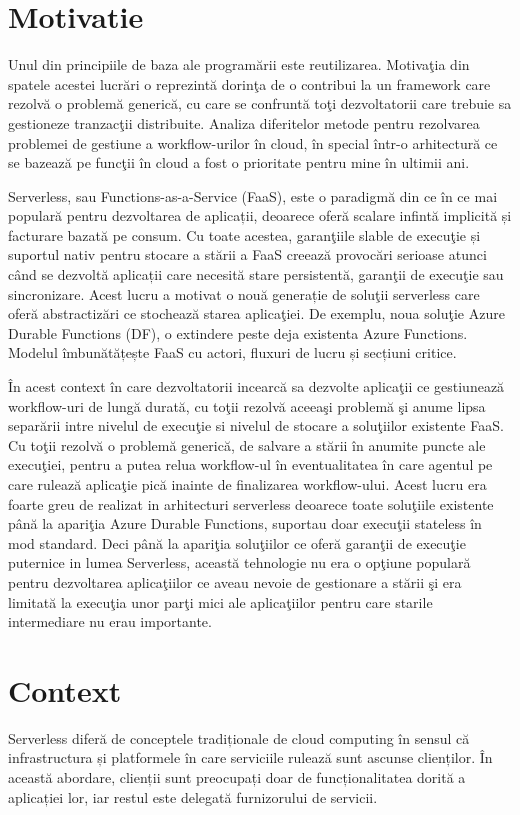 \documentclass[a4paper,12pt]{report}
\begin{document}
\section{Motivatie}
\quad Unul din principiile de baza ale programării este reutilizarea. Motivaţia din spatele acestei lucrări o reprezintă dorinţa de o contribui la un framework care rezolvă o problemă generică, cu care se confruntă toţi dezvoltatorii care trebuie sa gestioneze tranzacţii distribuite. Analiza diferitelor metode pentru rezolvarea problemei de gestiune a workflow-urilor în cloud, în special într-o arhitectură ce se bazează pe funcţii în cloud a fost o prioritate pentru mine în ultimii ani. 
\par
Serverless, sau Functions-as-a-Service (FaaS), este o paradigmă din ce în ce mai populară pentru dezvoltarea de aplicații, deoarece oferă scalare infintă implicită și facturare bazată pe consum. Cu toate acestea, garanţiile slable de execuţie și suportul nativ pentru stocare a stării a FaaS creează provocări serioase atunci când se dezvoltă aplicații care necesită stare persistentă, garanţii de execuţie sau sincronizare. Acest lucru a motivat o nouă generație de soluţii serverless care oferă abstractizări ce stochează starea aplicaţiei. De exemplu, noua soluţie Azure Durable Functions (DF), o extindere peste deja existenta Azure Functions. Modelul îmbunătățește FaaS cu actori, fluxuri de lucru și secțiuni critice.
\par
În acest context în care dezvoltatorii incearcă sa dezvolte aplicaţii ce gestiunează workflow-uri  de lungă durată, cu toţii rezolvă aceeaşi problemă şi anume lipsa separării intre nivelul de execuţie si nivelul de stocare a soluţiilor existente FaaS. Cu toţii rezolvă o problemă generică, de salvare a stării în anumite puncte ale execuţiei, pentru a putea relua workflow-ul în eventualitatea în care agentul pe care rulează aplicaţie pică inainte de finalizarea workflow-ului. Acest lucru era foarte greu de realizat in arhitecturi serverless deoarece toate soluţiile existente până la apariţia Azure Durable Functions, suportau doar execuţii stateless în mod standard. Deci până la apariţia soluţiilor ce oferă garanţii de execuţie puternice in lumea Serverless, această tehnologie nu era o opţiune populară pentru dezvoltarea aplicaţiilor ce aveau nevoie de gestionare a stării şi era limitată la execuţia unor parţi mici ale aplicaţiilor pentru care starile intermediare nu erau importante. 
\section{Context}
\quad Serverless diferă de conceptele tradiționale de cloud computing în sensul că infrastructura și platformele în care serviciile rulează sunt ascunse clienților. În această abordare, clienții sunt preocupați doar de funcționalitatea dorită a aplicației lor, iar restul este delegată furnizorului de servicii. \par
\end{document}
